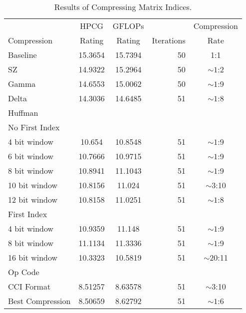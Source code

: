 \begin{table}
	\centering
	\begin{tabular}{l|S[table-format=2.6]|S[table-format=2.6]|r|c}
		            & {HPCG}   & {GFLOPs} &            & Compression \\
		Compression & {Rating} & {Rating} & Iterations & Rate \\
		\hline
		Baseline & 15.3654 & 15.7394 & 50 & 1:1 \\ %
		SZ & 14.9322 & 15.2964 & 50 & \({\sim}1\):2 \\
		Gamma & 14.6553 & 15.0062 & 50 & \({\sim}1\):9 \\ %
		Delta & 14.3036 & 14.6485 & 51 & \({\sim}1\):8 \\
		Huffman & & & & \\
		\hspace{3mm}No First Index & & & & \\
			\hspace{6mm}4 bit window & 10.654 & 10.8548 & 51 & \({\sim}1\):9 \\
			\hspace{6mm}6 bit window & 10.7666 & 10.9715 & 51 &  \({\sim}1\):9 \\
			\hspace{6mm}8 bit window & 10.8941 & 11.1043 & 51 & \({\sim}1\):9 \\
			\hspace{6mm}10 bit window & 10.8156 & 11.024 & 51 & \({\sim}3\):10 \\
			\hspace{6mm}12 bit window & 10.8158 & 11.0251 & 51 & \({\sim}1\):8 \\
		\hspace{3mm}First Index & & & & \\
			\hspace{6mm}4 bit window & 10.9359 & 11.148 & 51 & \({\sim}1\):9 \\
			\hspace{6mm}8 bit window & 11.1134 & 11.3336 & 51 & \({\sim}1\):9 \\
			\hspace{6mm}16 bit window & 10.3323 & 10.5819 & 51 & \({\sim}20\):11 \\
		Op Code & & & & \\
		\hspace{3mm}CCI Format~\cite{Lawlor:2013:compression} & 8.51257 & 8.63578 & 51 & \({\sim}3\):10 \\
		\hspace{3mm}Best Compression & 8.50659 & 8.62792 & 51 & \({\sim}1\):6 \\
	\end{tabular}
	\caption{Results of Compressing Matrix Indices.}
	\label{tab:results-ind}
\end{table}
